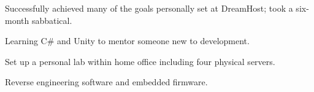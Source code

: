 \item Successfully achieved many of the goals personally set at DreamHost; took a six-month sabbatical.
\item Learning C\# and Unity to mentor someone new to development.
\item Set up a personal lab within home office including four physical servers.
\item Reverse engineering software and embedded firmware.
